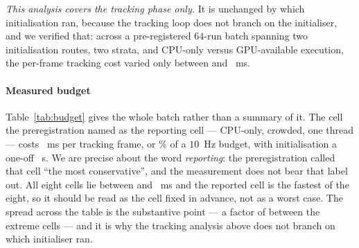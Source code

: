 \documentclass[review]{elsarticle}
\begin{document}
\emph{This analysis covers the tracking phase only.} It is unchanged by which
initialisation ran, because the tracking loop does not branch on the initialiser,
and we verified that: across a pre-registered $64$-run batch spanning two
initialisation routes, two strata, and CPU-only versus GPU-available execution, the
per-frame tracking cost varied only between \FrameMsMin{} and \FrameMsMax{}~ms.

\paragraph{Measured budget}
Table~\ref{tab:budget} gives the whole batch rather than a summary of it. The cell
the preregistration named as the reporting cell --- CPU-only, crowded, one thread ---
costs \FrameMsLearn{}~ms per tracking frame, or \FramePctLearn{}\% of a $10$~Hz
budget, with initialisation a one-off \InitSLearn{}~s. We are precise about the word
\emph{reporting}: the preregistration called that cell ``the most conservative'', and
the measurement does not bear that label out. All eight cells lie between \FrameMsMin{} and \FrameMsMax{}~ms and the
reported cell is the fastest of the eight, so it should be read as the cell fixed in
advance, not as a worst case. The spread across the table is the substantive point ---
a factor of \FrameMsSpread{} between the extreme cells --- and it is why the tracking analysis above does
not branch on which initialiser ran.
\end{document}
